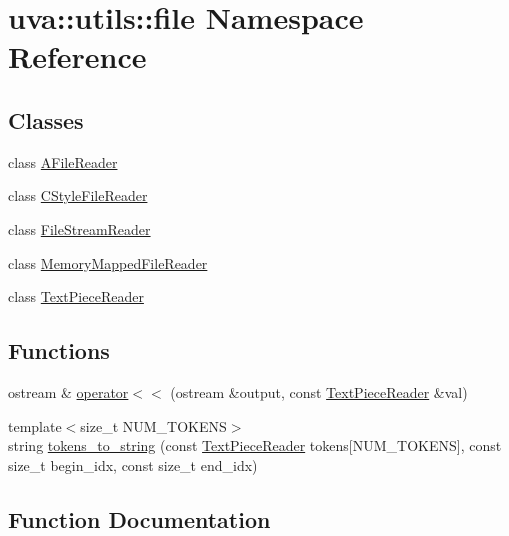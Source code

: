 \hypertarget{namespaceuva_1_1utils_1_1file}{}\section{uva\+:\+:utils\+:\+:file Namespace Reference}
\label{namespaceuva_1_1utils_1_1file}
\subsection*{Classes}
\begin{DoxyCompactItemize}
\item 
class \hyperlink{classuva_1_1utils_1_1file_1_1_a_file_reader}{A\+File\+Reader}
\item 
class \hyperlink{classuva_1_1utils_1_1file_1_1_c_style_file_reader}{C\+Style\+File\+Reader}
\item 
class \hyperlink{classuva_1_1utils_1_1file_1_1_file_stream_reader}{File\+Stream\+Reader}
\item 
class \hyperlink{classuva_1_1utils_1_1file_1_1_memory_mapped_file_reader}{Memory\+Mapped\+File\+Reader}
\item 
class \hyperlink{classuva_1_1utils_1_1file_1_1_text_piece_reader}{Text\+Piece\+Reader}
\end{DoxyCompactItemize}
\subsection*{Functions}
\begin{DoxyCompactItemize}
\item 
ostream \& \hyperlink{namespaceuva_1_1utils_1_1file_ab3202195b5a00d0457ce1667f7b14e56}{operator$<$$<$} (ostream \&output, const \hyperlink{classuva_1_1utils_1_1file_1_1_text_piece_reader}{Text\+Piece\+Reader} \&val)
\item 
{\footnotesize template$<$size\+\_\+t N\+U\+M\+\_\+\+T\+O\+K\+E\+N\+S$>$ }\\string \hyperlink{namespaceuva_1_1utils_1_1file_a6296460461767b4d12de496503a4136d}{tokens\+\_\+to\+\_\+string} (const \hyperlink{classuva_1_1utils_1_1file_1_1_text_piece_reader}{Text\+Piece\+Reader} tokens\mbox{[}N\+U\+M\+\_\+\+T\+O\+K\+E\+N\+S\mbox{]}, const size\+\_\+t begin\+\_\+idx, const size\+\_\+t end\+\_\+idx)
\end{DoxyCompactItemize}


\subsection{Function Documentation}
\hypertarget{namespaceuva_1_1utils_1_1file_ab3202195b5a00d0457ce1667f7b14e56}{}
